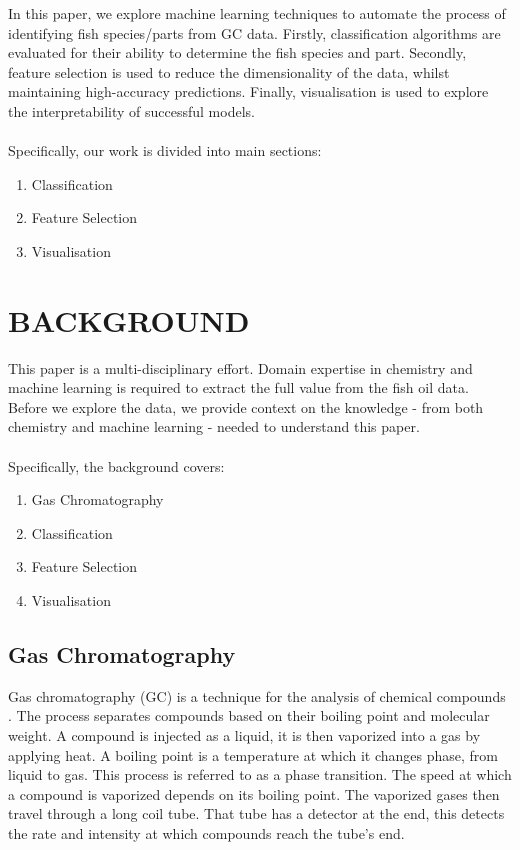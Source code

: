 \documentclass{article}
\begin{document}
In this paper, we explore machine learning techniques to automate the process of identifying fish species/parts from GC data.
Firstly, classification algorithms are evaluated for their ability to determine the fish species and part.
Secondly, feature selection is used to reduce the dimensionality of the data, whilst maintaining high-accuracy predictions.
Finally, visualisation is used to explore the interpretability of successful models.
\\\\
Specifically, our work is divided into main sections:

\begin{enumerate}
  \item Classification
  \item Feature Selection
  \item Visualisation
\end{enumerate}

\section{BACKGROUND}
\label{sec:background}

This paper is a multi-disciplinary effort.
Domain expertise in chemistry and machine learning is required to extract the full value from the fish oil data.
Before we explore the data, we provide context on the knowledge - from both chemistry and machine learning - needed to understand this paper.
\\\\
Specifically, the background covers:

\begin{enumerate}
  \item Gas Chromatography
  \item Classification
  \item Feature Selection
  \item Visualisation
\end{enumerate}

\subsection{Gas Chromatography}
\label{sec:background-gas-chromatography}

Gas chromatography (GC) is a technique for the analysis of chemical compounds \cite{eder1995gas,khan2013gas,restek2018high}.
The process separates compounds based on their boiling point and molecular weight.
A compound is injected as a liquid, it is then vaporized into a gas by applying heat.
A boiling point is a temperature at which it changes phase, from liquid to gas.
This process is referred to as a phase transition.
The speed at which a compound is vaporized depends on its boiling point.
The vaporized gases then travel through a long coil tube.
That tube has a detector at the end, this detects the rate and intensity at which compounds reach the tube's end.
\end{document}
